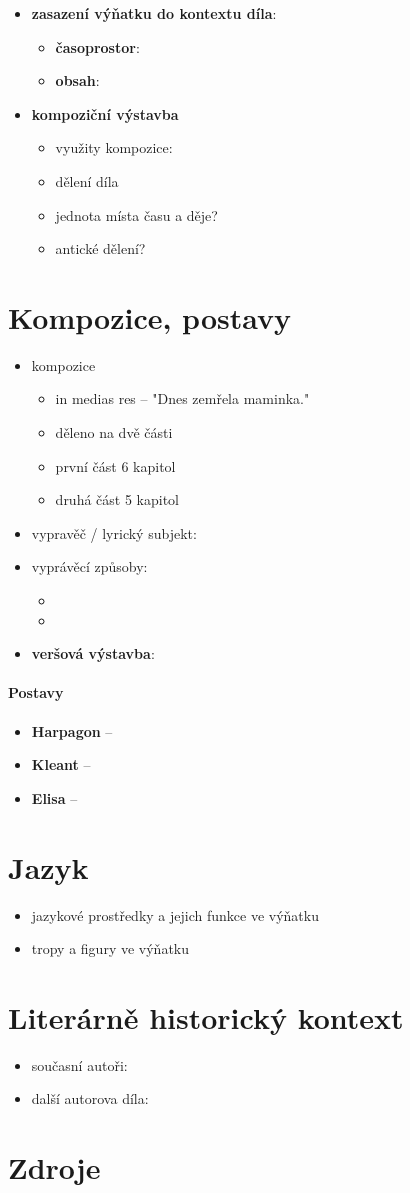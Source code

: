 \documentclass[10pt,a4paper]{article}
\begin{document}
\begin{itemize}
\item \textbf{zasazení výňatku do kontextu díla}:
	\begin{itemize}
	\item \textbf{časoprostor}:
	\item \textbf{obsah}: 
	\end{itemize}
\item \textbf{kompoziční výstavba}
	\begin{itemize}
	\item využity kompozice: 
	\item dělení díla
	\item jednota místa času a děje?
	\item antické dělení?
	\end{itemize}
\end{itemize}
\section*{Kompozice, postavy}
\begin{itemize}
\item kompozice
	\begin{itemize}
	\item in medias res -- "Dnes zemřela maminka."
	\item děleno na dvě části
	\item první část 6 kapitol
	\item druhá část 5 kapitol
	\end{itemize}
\item vypravěč / lyrický subjekt:
\item vyprávěcí způsoby:
	\begin{itemize}
	\item 
	\item
	\end{itemize}
\item \textbf{veršová výstavba}:	
\end{itemize}

\paragraph{Postavy}
\begin{itemize}
\item \textbf{Harpagon} --
\item \textbf{Kleant} --
\item \textbf{Elisa} --
\end{itemize}
\section*{Jazyk}
\begin{itemize}
\item jazykové prostředky a jejich funkce ve výňatku
\item tropy a figury ve výňatku
\end{itemize}
\section*{Literárně historický kontext}
\begin{itemize}
\item současní autoři:
\item další autorova díla:
\end{itemize}
\section*{Zdroje}
\end{document}
